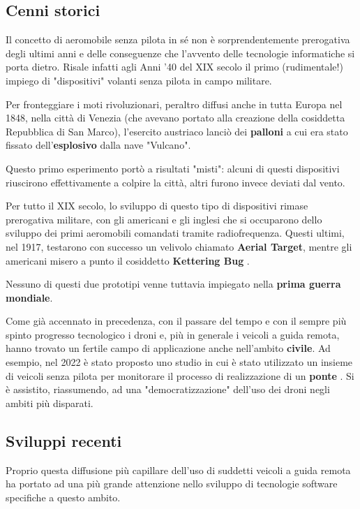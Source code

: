 \documentclass[a4paper, 12pt, oneside]{article}
\theoremstyle{definition}
\begin{document}
\subsection{Cenni storici}
Il concetto di aeromobile senza pilota in sé non è sorprendentemente prerogativa degli ultimi anni e delle conseguenze che l'avvento delle tecnologie informatiche si porta dietro. Risale infatti agli Anni '40 del XIX secolo il primo (rudimentale!) impiego di "dispositivi" volanti senza pilota in campo militare. 

Per fronteggiare i moti rivoluzionari, peraltro diffusi anche in tutta Europa nel 1848, nella città di Venezia (che avevano portato alla creazione della cosiddetta Repubblica di San Marco), l'esercito austriaco lanciò dei \textbf{palloni} a cui era stato fissato dell'\textbf{esplosivo} dalla nave "Vulcano". 

Questo primo esperimento portò a risultati "misti": alcuni di questi dispositivi riuscirono effettivamente a colpire la città, altri furono invece deviati dal vento.

Per tutto il XIX secolo, lo sviluppo di questo tipo di dispositivi rimase prerogativa militare, con gli americani e gli inglesi che si occuparono dello sviluppo dei primi aeromobili comandati tramite radiofrequenza. Questi ultimi, nel 1917, testarono con successo un velivolo chiamato \textbf{Aerial Target}, mentre gli americani misero a punto il cosiddetto \textbf{Kettering Bug} \cite{drones-history}.

Nessuno di questi due prototipi venne tuttavia impiegato nella \textbf{prima guerra mondiale}.

Come già accennato in precedenza, con il passare del tempo e con il sempre più spinto progresso tecnologico i droni e, più in generale i veicoli a guida remota, hanno trovato un fertile campo di applicazione anche nell'ambito \textbf{civile}. Ad esempio, nel 2022 è stato proposto uno studio in cui è stato utilizzato un insieme di veicoli senza pilota per monitorare il processo di realizzazione di un \textbf{ponte} \cite{rs14081858}.
Si è assistito, riassumendo, ad una "democratizzazione" dell'uso dei droni negli ambiti più disparati.

\subsection{Sviluppi recenti}
Proprio questa diffusione più capillare dell'uso di suddetti veicoli a guida remota ha portato ad una più grande attenzione nello sviluppo di tecnologie software specifiche a questo ambito. 
\end{document}
